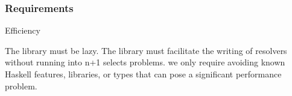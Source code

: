 \begin{frame}\frametitle{Requirements}  

\begin{alertblock}{Efficiency} 

The library must be lazy. The library must facilitate the writing of resolvers without running into n+1 selects problems. we only require avoiding known Haskell features, libraries, or types that can pose a significant performance problem.

\end{alertblock}

\end{frame}